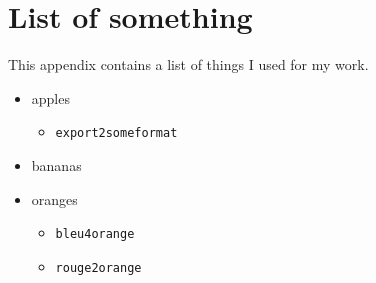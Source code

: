 \chapter{List of something} 

This appendix contains a list of things I used for my work.

\begin{itemize}
 \item apples
 \begin{itemize}
  \item \texttt{export2someformat}
 \end{itemize}
 \item bananas
 \item oranges
 \begin{itemize}
  \item \texttt{bleu4orange}
  \item \texttt{rouge2orange}
 \end{itemize}

\end{itemize}


\newpage